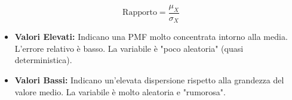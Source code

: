 \begin{equation}
\text{Rapporto} = \frac{\mu_X}{\sigma_X}
\end{equation}

\begin{itemize}
    \item \textbf{Valori Elevati:} Indicano una PMF molto concentrata intorno alla media. L'errore relativo è basso. La variabile è "poco aleatoria" (quasi deterministica).
    \item \textbf{Valori Bassi:} Indicano un'elevata dispersione rispetto alla grandezza del valore medio. La variabile è molto aleatoria e "rumorosa".
\end{itemize}